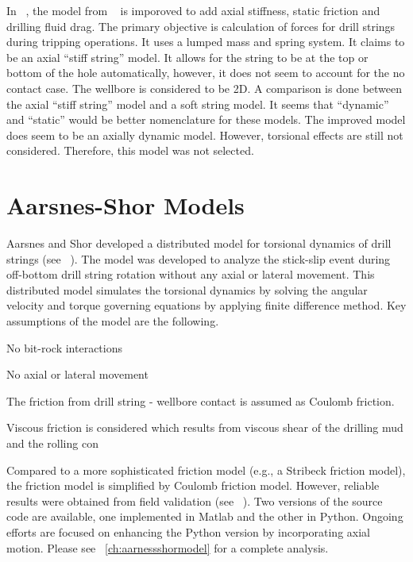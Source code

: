 In ~\cite{ref:zamanipour2018a}, the model from ~\cite{ref:miska2015a} is imporoved to add axial stiffness, static friction and drilling fluid drag.  The primary objective is calculation of forces for drill strings during tripping operations.  It uses a lumped mass and spring system.  It claims to be an axial ``stiff string'' model.  It allows for the string to be at the top or bottom of the hole automatically, however, it does not seem to account for the no contact case.  The wellbore is considered to be 2D.  A comparison is done between the axial ``stiff string'' model and a soft string model.  It seems that ``dynamic'' and ``static'' would be better nomenclature for these models.  The improved model does seem to be an axially dynamic model.  However, torsional effects are still not considered.  Therefore, this model was not selected.



\section{Aarsnes-Shor Models}
Aarsnes and Shor developed a distributed model for torsional dynamics of drill strings (see ~\cite{ref:aarsnes2017a}).  The model was developed to analyze the stick-slip event during off-bottom drill string rotation without any axial or lateral movement.  This distributed model simulates the torsional dynamics by solving the angular velocity and torque governing equations by applying finite difference method. Key assumptions of the model are the following.
\begin{bulletedlist}
	\item No bit-rock interactions
	\item No axial or lateral movement
	\item The friction from drill string - wellbore contact is assumed as Coulomb friction. \resolvedcomment{}
    \item Viscous friction is considered which results from viscous shear of the drilling mud and the rolling con
\end{bulletedlist}
Compared to a more sophisticated friction model (e.g., a Stribeck friction model), the friction model is simplified by Coulomb friction model. However, reliable results were obtained from field validation (see ~\cite{ref:aarsnes2017a}). \wording{}\resolvedcomment{} Two versions of the source code are available, one implemented in Matlab and the other in Python.  Ongoing efforts are focused on enhancing the Python version by incorporating axial motion. Please see \chaptername~\ref{ch:aarnessshormodel} for a complete analysis.


